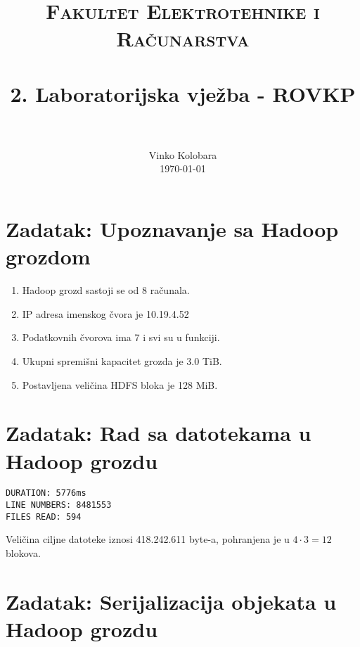 \documentclass[paper=a4, fontsize=11pt]{scrartcl}
\title{
		\usefont{OT1}{bch}{b}{n}
		\normalfont \normalsize \textsc{Fakultet Elektrotehnike i Računarstva} \\ [25pt]
		\horrule{0.5pt} \\[0.4cm]
		\huge 2. Laboratorijska vježba - ROVKP \\
		\horrule{2pt} \\[0.5cm]
}
\author{
		\normalfont 								\normalsize
        Vinko Kolobara\\[-3pt]		\normalsize
        \today
}
\date{}
\numberwithin{equation}{section}		%
\numberwithin{figure}{section}			%
\numberwithin{table}{section}				%
\begin{document}
\maketitle



\section{Zadatak: Upoznavanje sa Hadoop grozdom}

\begin{enumerate}
\item Hadoop grozd sastoji se od 8 računala.
\item IP adresa imenskog čvora je 10.19.4.52
\item Podatkovnih čvorova ima 7 i svi su u funkciji.
\item Ukupni spremišni kapacitet grozda je 3.0 TiB.
\item Postavljena veličina HDFS bloka je 128 MiB.
\end{enumerate}

\newpage
\section{Zadatak: Rad sa datotekama u Hadoop grozdu}



\begin{lstlisting}[caption=Ispis programa]
DURATION: 5776ms
LINE NUMBERS: 8481553
FILES READ: 594
\end{lstlisting}

Veličina ciljne datoteke iznosi 418.242.611 byte-a, pohranjena je u $4 \cdot 3=12$ blokova.
\newpage

\section{Zadatak: Serijalizacija objekata u Hadoop grozdu}

\end{document}
